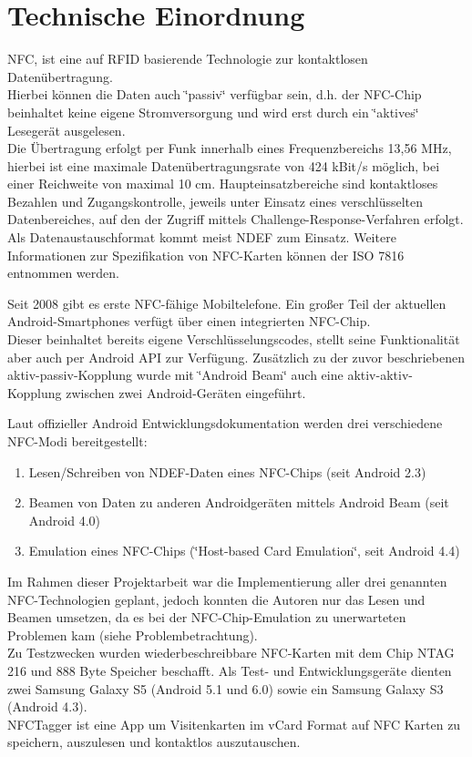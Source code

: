 \documentclass[a4paper,ngerman,12pt]{report}
\begin{document}
\chapter{Technische Einordnung}

\ac{NFC}, ist eine auf \ac{RFID} basierende Technologie zur kontaktlosen Datenübertragung. \\
Hierbei können die Daten auch \char`\"{}passiv\char`\"{} verfügbar sein, d.h. der NFC-Chip beinhaltet keine eigene Stromversorgung und wird erst durch ein \char`\"{}aktives\char`\"{} Lesegerät ausgelesen. \\
Die Übertragung erfolgt per Funk innerhalb eines Frequenzbereichs 13,56 MHz, hierbei ist eine maximale Datenübertragungsrate von 424 kBit/s möglich, bei einer Reichweite von maximal 10 cm. 
Haupteinsatzbereiche sind kontaktloses Bezahlen und Zugangskontrolle, jeweils unter Einsatz eines verschlüsselten Datenbereiches, auf den der Zugriff mittels Challenge-Response-Verfahren erfolgt. \\
Als Datenaustauschformat kommt meist \ac{NDEF} zum Einsatz. Weitere Informationen zur Spezifikation von NFC-Karten können der ISO 7816 entnommen werden.\newline

Seit 2008 gibt es erste NFC-fähige Mobiltelefone. Ein großer Teil der aktuellen Android-Smartphones verfügt über einen integrierten NFC-Chip. \\
Dieser beinhaltet bereits eigene Verschlüsselungscodes, stellt seine Funktionalität aber auch per Android API zur Verfügung. Zusätzlich zu der zuvor beschriebenen aktiv-passiv-Kopplung wurde mit \char`\"{}Android Beam\char`\"{} auch eine aktiv-aktiv-Kopplung zwischen zwei Android-Geräten eingeführt.

Laut offizieller Android Entwicklungsdokumentation werden drei verschiedene NFC-Modi bereitgestellt:


\begin{enumerate}[-]
\item Lesen/Schreiben von NDEF-Daten eines NFC-Chips (seit Android 2.3)
\item Beamen von Daten zu anderen Androidgeräten mittels Android Beam (seit Android 4.0)
\item Emulation eines NFC-Chips (\char`\"{}Host-based Card Emulation\char`\"{}, seit Android 4.4)
\end{enumerate}

Im Rahmen dieser Projektarbeit war die Implementierung aller drei genannten NFC-Technologien geplant, jedoch konnten die Autoren nur das Lesen und Beamen umsetzen, da es bei der NFC-Chip-Emulation zu unerwarteten Problemen kam (siehe Problembetrachtung).\\ 
Zu Testzwecken wurden wiederbeschreibbare NFC-Karten mit dem Chip NTAG 216 und 888 Byte Speicher beschafft. Als Test- und Entwicklungsgeräte dienten zwei Samsung Galaxy S5 (Android 5.1 und 6.0) sowie ein Samsung Galaxy S3 (Android 4.3). \\
NFCTagger ist eine App um Visitenkarten im vCard Format auf NFC Karten zu speichern, auszulesen und kontaktlos auszutauschen.
\end{document}
